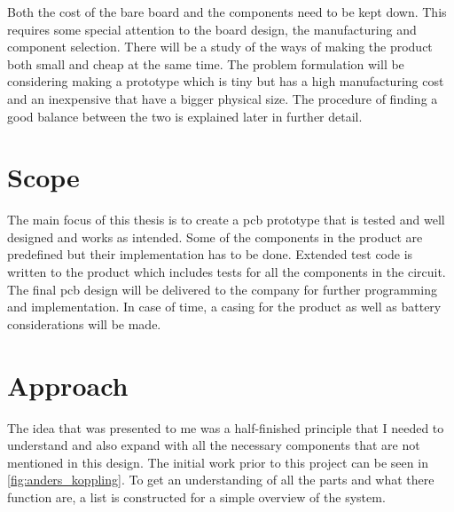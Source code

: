 Both the cost of the bare board and the components need to be kept down.  This requires some special attention to the board design, the manufacturing and component selection.
There will be a study of the ways of making the product both small and cheap at the same time. The problem formulation will be considering making a prototype which is tiny but has a high manufacturing cost and an inexpensive that have a bigger physical size. The procedure of finding a good balance between the two is explained later in further detail.


\section{Scope} 	%
The main focus of this thesis is to create a \gls{pcb} prototype that is tested and well designed and works as intended. Some of the components in the product are predefined but their implementation has to be done.
Extended test code is written to the product which includes tests for all the components in the circuit.  
The final \gls{pcb} design will be delivered to the company for further programming and implementation.
In case of time, a casing for the product as well as battery considerations will be made.


\newpage
\section{Approach} 	%
The idea that was presented to me was a half-finished principle that I needed to understand and also expand with all the necessary components that are not mentioned in this design. The initial work prior to this project can be seen in \autoref{fig:anders_koppling}.
To get an understanding of all the parts and what there function are, a list is constructed for a simple overview of the system.

